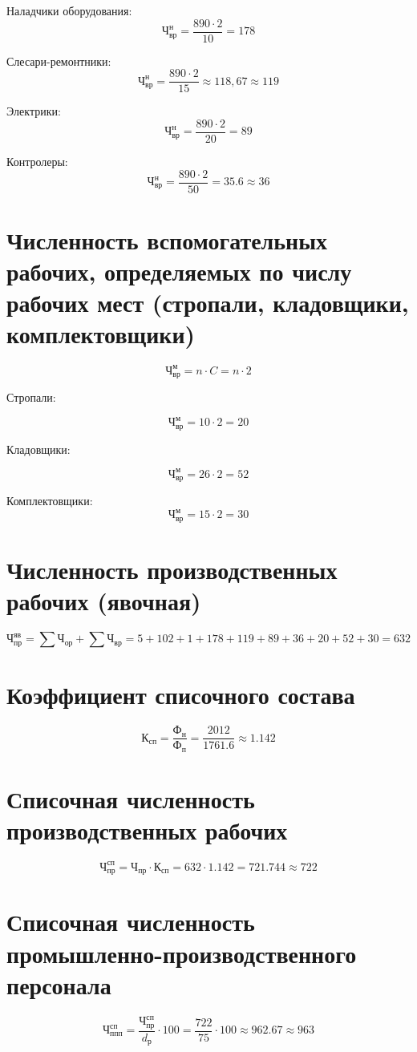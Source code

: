 Наладчики оборудования:
\[
\text{Ч}_\text{вр}^\text{н} = \frac{890 \cdot 2}{10} = 178
\]

Слесари-ремонтники:
\[
\text{Ч}_\text{вр}^\text{н} = \frac{890 \cdot 2}{15} \approx 118,67 \approx 119
\]

Электрики:
\[
\text{Ч}_\text{вр}^\text{н} = \frac{890 \cdot 2}{20} = 89
\]

Контролеры:
\[
\text{Ч}_\text{вр}^\text{н} = \frac{890 \cdot 2}{50} = 35.6 \approx 36
\]

\section{Численность вспомогательных рабочих, определяемых по числу рабочих мест (стропали, кладовщики, комплектовщики)}

\[
\text{Ч}_\text{вр}^\text{м} = n \cdot C = n \cdot 2
\]

Стропали:

\[
\text{Ч}_\text{вр}^\text{м} = 10 \cdot 2 = 20
\]

Кладовщики:

\[
\text{Ч}_\text{вр}^\text{м} = 26 \cdot 2 = 52
\]

Комплектовщики:
\[
\text{Ч}_\text{вр}^\text{м} = 15 \cdot 2 = 30
\]

\section{Численность производственных рабочих (явочная)}

\[
\text{Ч}_\text{пр}^\text{яв} = \sum \text{Ч}_\text{ор} + \sum \text{Ч}_\text{вр} = 5 + 102 +1 +178 +119 +89 +36 +20 +52 +30 = 632
\]


\section{Коэффициент списочного состава}

\[
\text{К}_\text{сп}=\frac{\text{Ф}_\text{н}}{\text{Ф}_\text{п}} = \frac{2012}{1761.6} \approx 1.142
\]

\section{Списочная численность производственных рабочих}

\[
\text{Ч}_\text{пр}^\text{сп} = \text{Ч}_\text{пр} \cdot \text{К}_\text{сп} = 632 \cdot 1.142 = 721.744 \approx 722
\]

\section{Списочная численность промышленно-производственного персонала}

\[
\text{Ч}_\text{ппп}^\text{сп} = \frac{\text{Ч}_\text{пр}^\text{сп}}{d_\text{р}} \cdot 100 = \frac{722}{75} \cdot 100 \approx 962.67 \approx 963
\]


